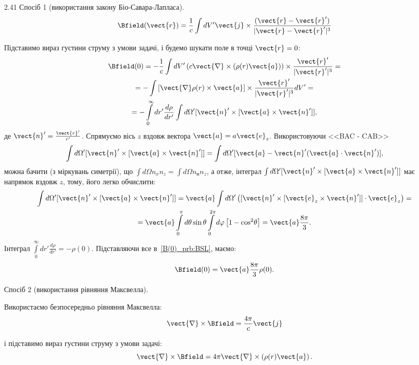 \begin{Solution}{2.{41}}
	Спосіб 1 (використання закону Біо-Савара-Лапласа).
	\[
		\Bfield(\vect{r}) = \frac1c \int dV' \vect{j} \times \frac{(\vect{r} - \vect{r}')}{|\vect{r} - \vect{r}'|^3}
	\]

	Підставимо вираз густини струму з умови задачі, і будемо шукати поле в точці $\vect{r} = 0$:
	\begin{multline}\label{B(0)_prb:BSL}
		\Bfield(0) = -\frac1c \int dV' \left( c\vect{\nabla}\times \left( \rho(r) \vect{a}\right) \right) \times \frac{\vect{r}'}{|\vect{r}'|^3} = \\
		= -\int \left[ \vect{\nabla}\rho(r)\times\vect{a} \right] \times \frac{\vect{r}'}{|\vect{r}'|^3} dV' = \\
		= -\int\limits_0^{\infty} dr'\frac{d\rho}{dr'} \int d\Omega' [{\vect{n}}' \times [{\vect{a}} \times {\vect{n}}']],
	\end{multline}
	де $\vect{n}' = \frac{\vect{r}'}{r'}$. Спрямуємо вісь $z$ вздовж вектора  $\vect{a} = a\vect{e}_z$. Використовуючи <<BAC - CAB>>
	\[
		\int {d\Omega'} [{\vect{n}}' \times [{\vect{a}} \times {\vect{n}}']] = \int {d\Omega'} [\vect{a} - \vect{n}'(\vect{a} \cdot {\vect{n}}')],
	\]
	можна бачити (з міркувань симетрії), що  $\int d\Omega n_x n_z = \int d\Omega n_н n_z $, а отже, інтеграл  $\int {d\Omega'} [{\vect{n}}' \times [{\vect{a}} \times {\vect{n}}']] $ має напрямок вздовж $z$, тому, його легко обчислити:
	\begin{multline}
		\int d\Omega' [{\vect{n}}' \times [{\vect{a}} \times {\vect{n}}']] = {\vect{a}}\int {d\Omega'} \left( {[{\vect{n}}' \times [{{\vect{e}}_z} \times {\vect{n}}']] \cdot {{\vect{e}}_z}} \right) = \\
		= \vect{a}\int\limits_0^\pi  {d\theta } \sin \theta \int\limits_0^{2\pi } {d\varphi } \left[ {1 - {\cos^2}\theta } \right] = \vect{a}\frac{8\pi}{3}.
	\end{multline}
	Інтеграл $\int\limits_0^{\infty} dr'\frac{d\rho}{dr'} = -\rho(0)$.
	Підставляючи все в~\eqref{B(0)_prb:BSL}, маємо:
	\[
		\Bfield(0) = \vect{a}\frac{8\pi}{3}\rho(0).
	\]

	Спосіб 2 (використання рівняння Максвелла).

	Використаємо безпосередньо рівняння Максвелла:
	\[
		\vect{\nabla}\times\Bfield = \frac{4\pi}{c}\vect{j}
	\]

	і підставимо вираз густини струму з умови задачі:
	\[
		\vect{\nabla}\times\Bfield = 4\pi\vect{\nabla}\times \left( \rho(r) \vect{a}\right).
	\]


\end{Solution}
